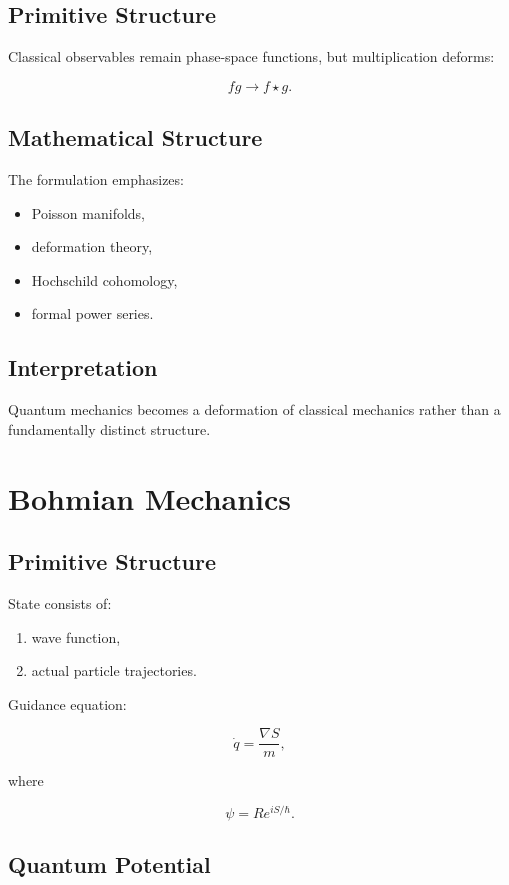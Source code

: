 \documentclass[11pt]{article}
\begin{document}
\subsection{Primitive Structure}

Classical observables remain phase-space functions, but multiplication deforms:

\[
fg
\rightarrow
f\star g.
\]

\subsection{Mathematical Structure}

The formulation emphasizes:

\begin{itemize}
\item Poisson manifolds,
\item deformation theory,
\item Hochschild cohomology,
\item formal power series.
\end{itemize}

\subsection{Interpretation}

Quantum mechanics becomes a deformation of classical mechanics rather than a fundamentally distinct structure.

\section{Bohmian Mechanics}

\subsection{Primitive Structure}

State consists of:

\begin{enumerate}
\item wave function,
\item actual particle trajectories.
\end{enumerate}

Guidance equation:

\[
\dot q
=
\frac{\nabla S}{m},
\]

where

\[
\psi = Re^{iS/\hbar}.
\]

\subsection{Quantum Potential}
\end{document}
